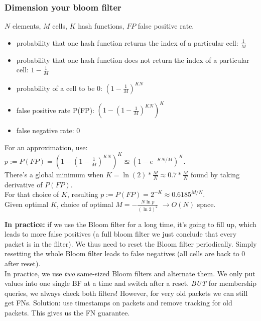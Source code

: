 \documentclass[11pt,oneside,a4paper]{article}
\begin{document}
\subsubsection{Dimension your bloom filter}
\label{bloom_filter_dimension}

$N$ elements, $M$ cells, $K$ hash functions, $FP$ false positive rate.

\vspace{-\topsep}
\begin{itemize}
	\setlength{\itemsep}{0pt}
	\setlength{\parskip}{0pt}
	\item probability that one hash function returns the index of a particular cell: $\frac{1}{M}$
	\item probability that one hash function does not return the index of a particular cell: $1 - \frac{1}{M}$
	\item probability of a cell to be 0: $(1 - \frac{1}{M})^{KN}$
	\item false positive rate P(FP): $(1 - (1 - \frac{1}{M})^{KN})^K$
	\item false negative rate: 0
\end{itemize}
\vspace{-\topsep}

For an approximation, use: $p := P(FP) = (1 - (1 - \frac{1}{M})^{KN})^K \approxeq (1 - e^{-KN/M})^K$.\\

There's a global minimum when $K = \ln(2) * \frac{M}{N}  \approx 0.7*\frac{M}{N}$ found by taking derivative of $P(FP)$.\\
For that choice of $K$, resulting $p := P(FP) = 2^{-K} \approx 0.6185^{M/N}$.\\
Given optimal $K$, choice of optimal $M = -\frac{N \ln p}{(\ln2)^2}$ $\rightarrow O(N)$ space.

\newpage

\textbf{In practice:} if we use the Bloom filter for a long time, it's going to fill up, which leads to more false positives (a full bloom filter we just conclude that every packet is in the filter). We thus need to reset the Bloom filter periodically. Simply resetting the whole Bloom filter leads to false negatives (all cells are back to 0 after reset).\\
In practice, we use \textit{two} same-sized Bloom filters and alternate them. We only put values into one single BF at a time and switch after a reset. \textit{BUT} for membership queries, we always check both filters! However, for very old packets we can still get FNs. Solution: use timestamps on packets and remove tracking for old packets. This gives us the FN guarantee.
\end{document}
